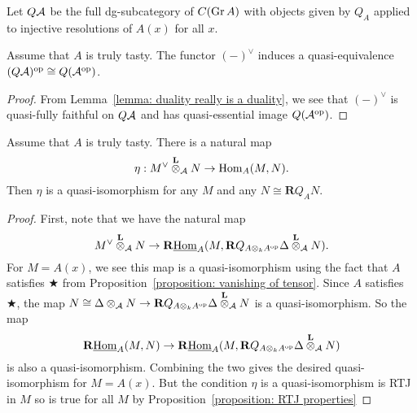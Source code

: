 \documentclass[dissertation.tex]{subfiles}
\begin{document}
\begin{definition}
  Let \(Q\mathcal{A}\) be the full dg-subcategory of \(C(\operatorname{Gr}A)\) with objects given by \(Q_A\) applied to injective resolutions of \(A(x)\) for all \(x\). 
\end{definition}

\begin{corollary} \label{corollary: duality is a duality}
  Assume that \(A\) is truly tasty. The functor \((-)^\vee\) induces a quasi-equivalence \((Q\mathcal{A})^{\operatorname{op}} \cong Q(\mathcal{A}^{\operatorname{op}})\). 
\end{corollary}

\begin{proof}
  From Lemma~\ref{lemma: duality really is a duality}, we see that \((-)^\vee\) is quasi-fully faithful on \(Q\mathcal{A}\) and has quasi-essential image \(Q(\mathcal{A}^{\operatorname{op}})\). 
\end{proof}

\begin{lemma} \label{lemma: trace map}
  Assume that \(A\) is truly tasty. There is a natural map 
  \begin{displaymath}
    \eta : M^\vee \overset{\mathbf{L}}{\otimes}_{\mathcal A} N \to \operatorname{Hom}_A(M,N).
  \end{displaymath}
  Then \(\eta\) is a quasi-isomorphism for any \(M\) and any \(N \cong \mathbf{R}Q_A N\). 
\end{lemma}

\begin{proof}
  First, note that we have the natural map 
  \begin{displaymath}
    M^\vee \overset{\mathbf{L}}{\otimes}_{\mathcal A} N \to \mathbf{R}\underline{\operatorname{Hom}}_A(M, \mathbf{R}Q_{A \otimes_k A^{\operatorname{op}}} \Delta \overset{\mathbf{L}}{\otimes}_{\mathcal A} N).
  \end{displaymath}
  For \(M = A(x)\), we see this map is a quasi-isomorphism using the fact that \(A\) satisfies \(\bigstar\) from Proposition~\ref{proposition: vanishing of tensor}. 
  Since \(A\) satisfies \(\bigstar\), the map \(N \cong \Delta \otimes_{\mathcal A} N \to \mathbf{R}Q_{A \otimes_k A^{\operatorname{op}}} \Delta \overset{\mathbf{L}}{\otimes}_{\mathcal A} N\) is a quasi-isomorphism. So the map  
  \begin{displaymath}
    \mathbf{R}\underline{\operatorname{Hom}}_A(M, N) \to \mathbf{R}\underline{\operatorname{Hom}}_A(M, \mathbf{R}Q_{A \otimes_k A^{\operatorname{op}}} \Delta \overset{\mathbf{L}}{\otimes}_{\mathcal A} N)
  \end{displaymath}
  is also a quasi-isomorphism. Combining the two gives the desired quasi-isomorphism for \(M = A(x)\). But the condition \(\eta\) is a quasi-isomorphism is RTJ in \(M\) so is true for all \(M\) by Proposition~\ref{proposition: RTJ properties}
\end{proof}
\end{document}
